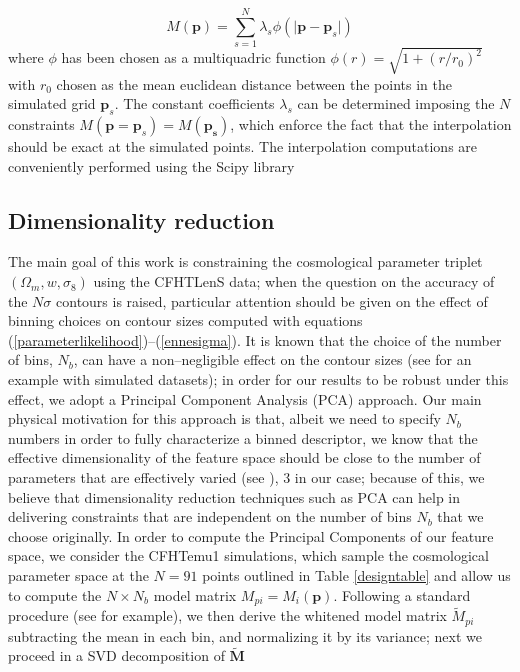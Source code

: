 \documentclass[reprint,aps,prd,superscriptaddress,showkeys,showpacs]{revtex4-1}
\begin{document}
\begin{equation}
M(\mathbf{p}) = \sum_{s=1}^N \lambda_s\phi(\vert\mathbf{p}-\mathbf{p}_s\vert)
\end{equation}
%
where $\phi$ has been chosen as a multiquadric function $\phi(r)=\sqrt{1+(r/r_0)^2}$ with $r_0$ chosen as the mean euclidean distance between the points in the simulated grid $\mathbf{p}_s$. The constant coefficients $\lambda_s$ can be determined imposing the $N$ constraints $M(\mathbf{p}=\mathbf{p}_s)=M(\mathbf{p_s})$, which enforce the fact that the interpolation should be exact at the simulated points. The interpolation computations are conveniently performed using the Scipy library \citep{scipy} 

\subsection{Dimensionality reduction}
\label{pcasection}
The main goal of this work is constraining the cosmological parameter triplet $(\Omega_m,w,\sigma_8)$ using the CFHTLenS data; when the question on the accuracy of the $N\sigma$ contours is raised, particular attention should be given on the effect of binning choices on contour sizes computed with equations (\ref{parameterlikelihood})--(\ref{ennesigma}). It is known that the choice of the number of bins, $N_b$, can have a non--negligible effect on the contour sizes (see \citep{Petri2013} for an example with simulated datasets); in order for our results to be robust under this effect, we adopt a Principal Component Analysis (PCA) approach. Our main physical motivation for this approach is that, albeit we need to specify $N_b$ numbers in order to fully characterize a binned descriptor, we know that the effective dimensionality of the feature space should be close to the number of parameters that are effectively varied (see \citep{coyote2}), 3 in our case; because of this, we believe that dimensionality reduction techniques such as PCA can help in delivering constraints that are independent on the number of bins $N_b$ that we choose originally. In order to compute the Principal Components of our feature space, we consider the CFHTemu1 simulations, which sample the cosmological parameter space at the $N=91$ points outlined in Table \ref{designtable} and allow us to compute the $N\times N_b$ model matrix $M_{pi}=M_i(\mathbf{p})$. Following a standard procedure (see \citep{astroMLText} for example), we then derive the whitened model matrix $\tilde{M}_{pi}$ subtracting the mean in each bin, and normalizing it by its variance; next we proceed in a SVD decomposition of $\mathbf{\tilde{M}}$
\end{document}
